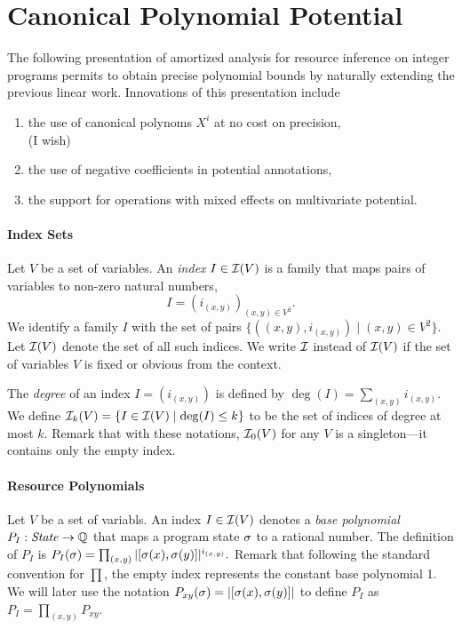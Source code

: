 \documentclass[nocopyrightspace,preprint]{sigplanconf-pldi15}
\begin{document}
\section{Canonical Polynomial Potential}

The following presentation of amortized analysis for resource
inference on integer programs permits to obtain precise polynomial
bounds by naturally extending the previous linear work. Innovations
of this presentation include
\begin{enumerate}
\item the use of canonical polynoms $X^i$ at no cost on precision,
 \\ (I wish)
\item the use of negative coefficients in potential annotations,
\item the support for operations with mixed effects on multivariate potential.
\end{enumerate}

\paragraph{Index Sets}

Let $V$ be a set of variables.  An \emph{index} $I \in \mathcal{I}(V)$ is a
family that maps pairs of variables to non-zero natural numbers,
$$
I = (i_{(x,y)})_{(x,y) \in V^2} .
$$
%
We identify a family $I$ with the set of pairs $\{ ((x,y),i_{(x,y)})
\mid (x,y) \in V^2\}$.
Let $\mathcal{I}(V)$ denote the set of all such indices.  We write $\mathcal{I}$
instead of $\mathcal{I}(V)$ if the set of variables $V$ is fixed or obvious
from the context.
%

The \emph{degree} of an index $I = (i_{(x,y)})$
is defined by
$
\deg(I) = \sum_{(x,y)} i_{(x,y)}.
$
We define $\mathcal{I}_k(V) = \{ I \in \mathcal{I}(V) \mid \deg(I) \leq k
\}$ to be the set of indices of degree at most $k$.  Remark
that with these notations, $\mathcal{I}_0(V)$ for any $V$ is a
singleton---it contains only the empty index.

\paragraph{Resource Polynomials}

Let $V$ be a set of variabls.  An index $I \in \mathcal{I}(V)$ denotes a
\emph{base polynomial} $P_I : \mathit{State} \to \mathbb{Q}$ that maps a program
state $\sigma$ to a rational number.  The definition of $P_I$ is
$
P_I(\sigma) = \prod_{(x,y)} |[\sigma(x),\sigma(y)]|^{i_{(x,y)}}.
$
Remark that following the standard convention for $\prod$, the
empty index represents the constant base polynomial 1.  We will
later use the notation $P_{xy}(\sigma) = |[\sigma(x),\sigma(y)]|$
to define $P_I$ as $P_I = \prod_{(x,y)} P_{xy}$.
\end{document}
